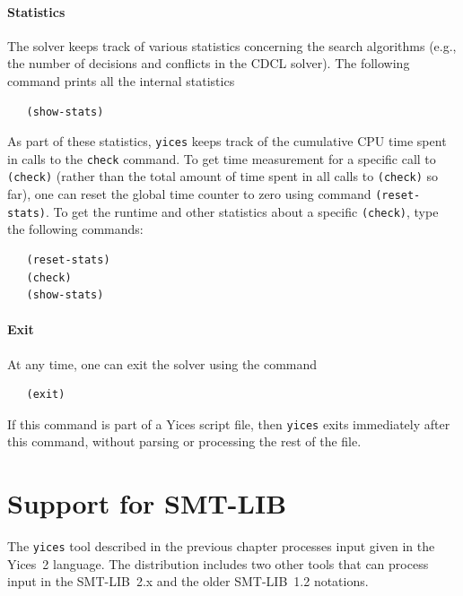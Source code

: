 \documentclass[11pt,twoside,fleqn,openright,titlepage]{cslreport}
\begin{document}
\subsubsection*{Statistics}

The solver keeps track of various statistics concerning the search
algorithms (e.g., the number of decisions and conflicts in the CDCL
solver). The following command prints all the internal statistics
\begin{small}
\begin{verbatim}
   (show-stats)
\end{verbatim}
\end{small}
As part of these statistics, \texttt{yices} keeps track of the
cumulative CPU time spent in calls to the \texttt{check} command.  To
get time measurement for a specific call to \texttt{(check)} (rather
than the total amount of time spent in all calls to \texttt{(check)}
so far), one can reset the global time counter to zero using command
\texttt{(reset-stats)}. To get the runtime and other statistics about
a specific \texttt{(check)}, type the following commands:
\begin{small}
\begin{verbatim}
   (reset-stats)
   (check)
   (show-stats)
\end{verbatim}
\end{small}

\subsubsection*{Exit}

At any time, one can exit the solver using the command
\begin{small}
\begin{verbatim}
   (exit)
\end{verbatim}
\end{small}
If this command is part of a Yices script file, then \texttt{yices}
exits immediately after this command, without parsing or processing the
rest of the file.


\chapter{Support for SMT-LIB}
\label{yices-smt}

The \texttt{yices} tool described in the previous chapter processes
input given in the Yices~2 language. The distribution includes two
other tools that can process input in the SMT-LIB~2.x and the older
SMT-LIB~1.2 notations.
\end{document}
